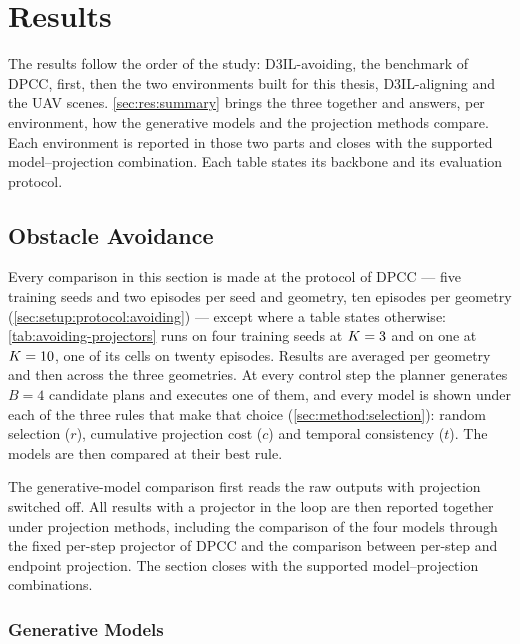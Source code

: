 \chapter{Results}\label{ch:results}

The results follow the order of the study: D3IL-avoiding, the benchmark of \ac{DPCC}, first, then
the two environments built for this thesis, D3IL-aligning and the UAV scenes. \autoref{sec:res:summary} brings the three together and
answers, per environment, how the generative models and the projection methods compare. Each
environment is reported in those two parts and closes with the supported model--projection combination.
Each table states its backbone and its evaluation protocol.

\section{Obstacle Avoidance}\label{sec:res:state}

Every comparison in this section is made at the protocol of \ac{DPCC} --- five training seeds and two
episodes per seed and geometry, ten episodes per geometry (\autoref{sec:setup:protocol:avoiding}) ---
except where a table states otherwise: \autoref{tab:avoiding-projectors} runs on four training seeds at
$K=3$ and on one at $K=10$, one of its cells on twenty episodes.
Results are averaged per geometry and then across the three geometries. At every control step the planner generates
$B=4$ candidate plans and executes one of them, and every model is shown under each of the three rules
that make that choice (\autoref{sec:method:selection}): random selection ($r$), cumulative projection
cost ($c$) and temporal consistency ($t$). The models are then compared at their best rule.

The generative-model comparison first reads the raw outputs with projection switched off. All results
with a projector in the loop are then reported together under projection methods, including the
comparison of the four models through the fixed per-step projector of \ac{DPCC} and the comparison
between per-step and endpoint projection. The section closes with the supported model--projection
combinations.

\subsection{Generative Models}\label{sec:res:avoiding:models}

